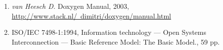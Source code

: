 \documentclass[../document.tex]{subfiles}
\begin{document}
\begin{enumerate}
    \item \textit{van Heesch D.} Doxygen Manual, 2003, \\\href{http://www.stack.nl/~dimitri/doxygen/manual.html}{http://www.stack.nl/~dimitri/doxygen/manual.html}
    \item ISO/IEC 7498-1:1994, Information technology — Open Systems \\Interconnection — Basic Reference Model: The Basic Model., 59 pp.
\end{enumerate}
\end{document}
